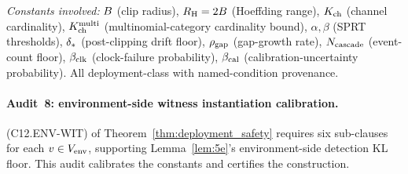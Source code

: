 \emph{Constants involved:} $B$ (clip radius), $R_{\mathrm{H}} = 2B$
(Hoeffding range), $K_{\mathrm{ch}}$ (channel cardinality), $K_{\mathrm{ch}}^{\mathrm{multi}}$
(multinomial-category cardinality bound), $\alpha, \beta$ (SPRT
thresholds), $\delta_{*}$ (post-clipping drift floor), $\rho_{\mathrm{gap}}$
(gap-growth rate), $N_{\mathrm{cascade}}$ (event-count floor), $\beta_{\mathrm{clk}}$
(clock-failure probability), $\beta_{\mathrm{cal}}$ (calibration-uncertainty
probability).  All deployment-class with named-condition
provenance.

\paragraph{Audit~8: environment-side witness instantiation
calibration.}

(C12.ENV-WIT) of Theorem~\ref{thm:deployment_safety} requires
six sub-clauses for each $v \in V_{\mathrm{env}}$, supporting
Lemma~\ref{lem:5e}'s environment-side detection KL floor.  This
audit calibrates the constants and certifies the construction.

